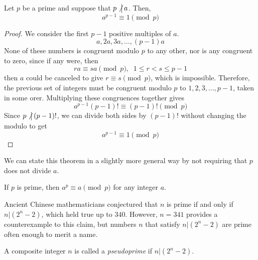 \documentclass{article}
\newcounter{theorem}[section]
\newcounter{definition}[section]
\newcounter{example}[section]
\begin{document}
\begin{theorem}
  \label{thm:fermats-little-theorem}
Let $p$ be a prime and suppose that $p \not\big| \,a$. Then, 
\begin{equation}
  a^{p-1} \equiv 1 \pmod{p}
\end{equation}
\end{theorem}
\begin{proof}
We consider the first $p-1$ positive multiples of $a$. 
\begin{equation}
  a, 2a, 3a, ..., (p-1) a
\end{equation}
None of these numbers is congruent modulo $p$ to any other, nor is any congruent to zero, since if any were, then 
\begin{equation}
  ra \equiv sa \pmod{p}, \;\; 1 \leq r < s \leq p-1
\end{equation}
then $a$ could be canceled to give $r \equiv s \pmod{p}$, which is impossible. Therefore, the previous set of integers must be congruent modulo $p$ to $1, 2, 3, ..., p-1$, taken in some orer. Multiplying these congruences together gives 
\begin{equation}
  a^{p-1} (p-1)! \equiv (p-1)! \pmod{p}
\end{equation}
Since $p \not\big| \, (p-1)!$, we can divide both sides by $(p-1)!$ without changing the modulo to get
\begin{equation}
  a^{p-1} \equiv 1 \pmod{p}
\end{equation}
\end{proof}

We can state this theorem in a slightly more general way by not requiring that $p$ does not divide $a$. 

\begin{corollary}
  \label{thm:fermats-little-theorem-general-form}
If $p$ is prime, then $a^p \equiv a \pmod{p}$ for any integer $a$. 
\end{corollary}

Ancient Chinese mathematicians conjectured that $n$ is prime if and only if $n|(2^n - 2)$, which held true up to $340$. However, $n = 341$ provides a counterexample to this claim, but numbers $n$ that satisfy $n | (2^n - 2)$ are prime often enough to merit a name. 

\begin{definition}[Pseudoprime]
  \label{def:pseudoprime}
A composite integer $n$ is called a \textit{pseudoprime} if $n | (2^n - 2)$. 
\end{definition}
\end{document}

